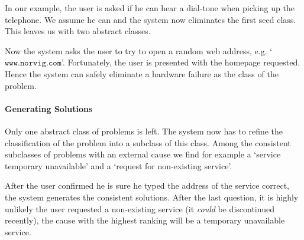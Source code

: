 \documentclass[a4paper,11pt]{article}
\begin{document}
In our example, the user is asked if he can hear a dial-tone when picking up
the telephone. We assume he can and the system now eliminates the first seed
class. This leaves us with two abstract classes.

Now the system asks the user to try to open a random web address,
e.g. `$\texttt{www.norvig.com}$'. Fortunately, the user is presented with the
homepage requested. Hence the system can safely eliminate a hardware failure
as the class of the problem.

\paragraph{Generating Solutions}

Only one abstract class of problems is left. The system now has to refine the
classification of the problem into a subclass of this class. Among the
consistent subclasses of problems with an external cause we find for example a
`service temporary unavailable' and a `request for non-existing
service'.

After the user confirmed he is sure he typed the address of the service
correct, the system generates the consistent solutions. After the last
question, it is highly unlikely the user requested a non-existing service (it
\emph{could} be discontinued recently), the cause with the highest ranking
will be a temporary unavailable service.
\end{document}

